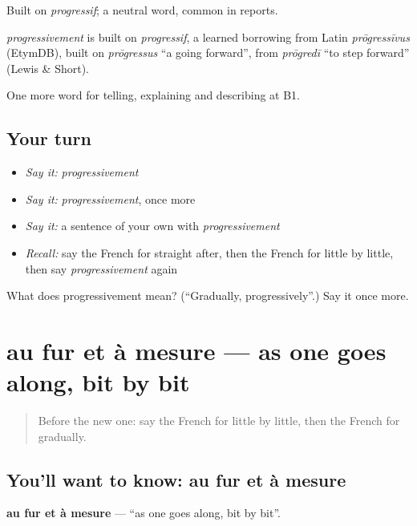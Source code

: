 Built on \emph{progressif}; a neutral word, common in reports.

\begin{cousinweb}
\emph{progressivement} is built on \emph{progressif}, a learned borrowing from Latin \emph{prōgressīvus} (EtymDB), built on \emph{prōgressus} \textquotedblleft{}a going forward\textquotedblright{}, from \emph{prōgredī} \textquotedblleft{}to step forward\textquotedblright{} (Lewis \& Short).
\end{cousinweb}

\begin{grammarlens}[title={What you've built}]
One more word for telling, explaining and describing at B1.
\end{grammarlens}

\subsection*{Your turn}
\begin{itemize}
\raggedright
  \item \emph{Say it:} \emph{progressivement}
  \item \emph{Say it:} \emph{progressivement}, once more
  \item \emph{Say it:} a sentence of your own with \emph{progressivement}
  \item \emph{Recall:} say the French for straight after, then the French for little by little, then say \emph{progressivement} again
\end{itemize}

\begin{tcolorbox}[breakable,colback=teal!4,colframe=teal!35!black,title={Before you move on}]
What does progressivement mean? (\textquotedblleft{}Gradually, progressively\textquotedblright{}.) Say it once more.
\end{tcolorbox}
\section[au fur et à mesure]{au fur et à mesure — as one goes along, bit by bit}

\label{lesson:FR-C271-au-fur-et-a-mesure}



\begin{quote}
Before the new one: say the French for little by little, then the French for gradually.
\end{quote}

\subsection*{You'll want to know: au fur et à mesure}
\textbf{au fur et à mesure} — \textquotedblleft{}as one goes along, bit by bit\textquotedblright{}.

